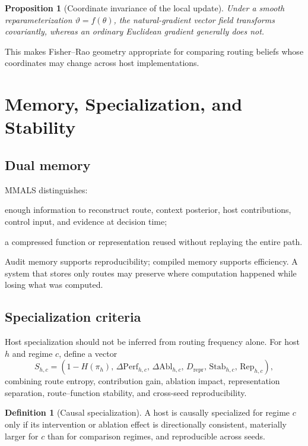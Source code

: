 \documentclass[11pt]{article}
\newtheorem{proposition}{Proposition}
\theoremstyle{definition}\newtheorem{definition}{Definition}\newtheorem{assumption}{Assumption}
\theoremstyle{remark}\newtheorem{remark}{Remark}
\begin{document}
\begin{proposition}[Coordinate invariance of the local update]
Under a smooth reparameterization $\vartheta=f(\theta)$, the natural-gradient vector field transforms covariantly, whereas an ordinary Euclidean gradient generally does not.
\end{proposition}
This makes Fisher--Rao geometry appropriate for comparing routing beliefs whose coordinates may change across host implementations.

\section{Memory, Specialization, and Stability}
\subsection{Dual memory}
MMALS distinguishes:
\begin{description}[leftmargin=2.2cm,style=nextline]
\item[Audit memory] enough information to reconstruct route, context posterior, host contributions, control input, and evidence at decision time;
\item[Compiled memory] a compressed function or representation reused without replaying the entire path.
\end{description}
Audit memory supports reproducibility; compiled memory supports efficiency. A system that stores only routes may preserve where computation happened while losing what was computed.

\subsection{Specialization criteria}
Host specialization should not be inferred from routing frequency alone. For host $h$ and regime $c$, define a vector
\begin{equation}
S_{h,c}=(1-H(\pi_h),\,\Delta\mathrm{Perf}_{h,c},\,\Delta\mathrm{Abl}_{h,c},\,D_{\mathrm{repr}},\,\mathrm{Stab}_{h,c},\,\mathrm{Rep}_{h,c}),
\end{equation}
combining route entropy, contribution gain, ablation impact, representation separation, route--function stability, and cross-seed reproducibility.

\begin{definition}[Causal specialization]
A host is causally specialized for regime $c$ only if its intervention or ablation effect is directionally consistent, materially larger for $c$ than for comparison regimes, and reproducible across seeds.
\end{definition}
\end{document}
